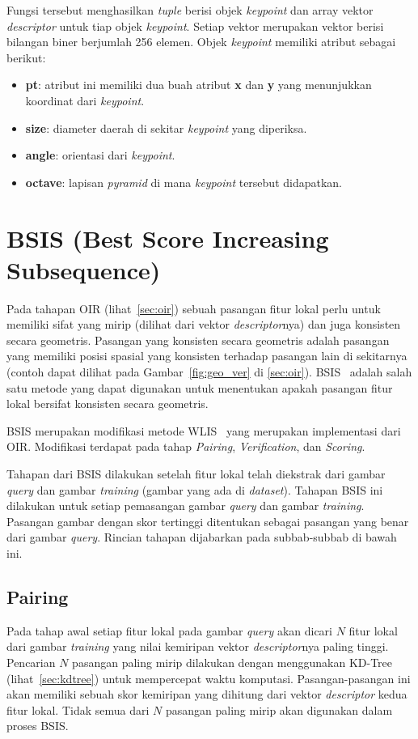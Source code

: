 Fungsi tersebut menghasilkan \textit{tuple} berisi objek \textit{keypoint} dan array vektor \textit{descriptor} untuk tiap objek \textit{keypoint}. Setiap vektor merupakan vektor berisi bilangan biner berjumlah 256 elemen. Objek \textit{keypoint} memiliki atribut sebagai berikut:
\begin{itemize}
	\item \textbf{pt}: atribut ini memiliki dua buah atribut \textbf{x} dan \textbf{y} yang menunjukkan koordinat dari \textit{keypoint}.
	\item \textbf{size}: diameter daerah di sekitar \textit{keypoint} yang diperiksa.
	\item \textbf{angle}: orientasi dari \textit{keypoint}.
	\item \textbf{octave}: lapisan \textit{pyramid} di mana \textit{keypoint} tersebut didapatkan.
\end{itemize}

\section{BSIS (Best Score Increasing Subsequence)}
\label{sec:bsis}
Pada tahapan OIR (lihat~\ref{sec:oir}) sebuah pasangan fitur lokal perlu untuk memiliki sifat yang mirip (dilihat dari vektor \textit{descriptor}nya) dan juga konsisten secara geometris. Pasangan yang konsisten secara geometris adalah pasangan yang memiliki posisi spasial yang konsisten terhadap pasangan lain di sekitarnya (contoh dapat dilihat pada Gambar~\ref{fig:geo_ver} di \ref{sec:oir}). BSIS~\cite{kusuma2019geometric} adalah salah satu metode yang dapat digunakan untuk menentukan apakah pasangan fitur lokal bersifat konsisten secara geometris. 

BSIS merupakan modifikasi metode WLIS~\cite{kusuma2012appearance} yang merupakan implementasi dari OIR. Modifikasi terdapat pada tahap \textit{Pairing}, \textit{Verification}, dan \textit{Scoring}. 

Tahapan dari BSIS dilakukan setelah fitur lokal telah diekstrak dari gambar \textit{query} dan gambar \textit{training} (gambar yang ada di \textit{dataset}). Tahapan BSIS ini dilakukan untuk setiap pemasangan gambar \textit{query} dan gambar \textit{training}. Pasangan gambar dengan skor tertinggi ditentukan sebagai pasangan yang benar dari gambar \textit{query}. Rincian tahapan dijabarkan pada subbab-subbab di bawah ini. 

\subsection{Pairing}
\label{subsec:bsis_pairing}
Pada tahap awal setiap fitur lokal pada gambar \textit{query} akan dicari $N$ fitur lokal dari gambar \textit{training} yang nilai kemiripan vektor \textit{descriptor}nya paling tinggi. Pencarian $N$ pasangan paling mirip dilakukan dengan menggunakan KD-Tree (lihat~\ref{sec:kdtree}) untuk mempercepat waktu komputasi. Pasangan-pasangan ini akan memiliki sebuah skor kemiripan yang dihitung dari vektor \textit{descriptor} kedua fitur lokal. Tidak semua dari $N$ pasangan paling mirip akan digunakan dalam proses BSIS. 

